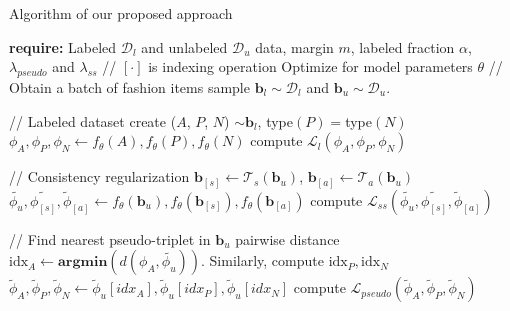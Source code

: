 \documentclass[sigconf]{acmart}
\newcommand{\algocomment}[1]{{\color{algoGray} #1}}
\begin{document}
\begin{algorithm}
\caption{Algorithm of our proposed approach}
\label{algo}
\begin{algorithmic}[1]
\small
\STATE \textbf{require:} Labeled $\mathcal{D}_l$ and unlabeled $\mathcal{D}_u$ data, margin $m$, labeled fraction $\alpha$, $\lambda_{pseudo}$ and $\lambda_{ss}$ \algocomment{// $[\cdot]$ is indexing operation} 
\STATE Optimize for model parameters $\theta$ 
\STATE {} 
	\STATE  \hspace{0.1in} \algocomment{{ // Obtain a batch of fashion items }}
      \STATE \hspace{0.1in} sample $\mathbf{b}_l \sim \mathcal{D}_l$ and $\mathbf{b}_u \sim \mathcal{D}_u$.
       
    \STATE \vspace{1mm} \hspace{0.1in} \algocomment{{// Labeled dataset }}
      \STATE \hspace{0.1in} create ($A$, $P$, $N$) $\sim \mathbf{b}_l$,  type$(P) = $type$(N)$ ~~~ 
      \STATE \hspace{0.1in} $\phi_A, \phi_P, \phi_N \leftarrow f_{\theta}(A), f_{\theta}(P), f_{\theta}(N)$ 
      \STATE \hspace{0.1in} compute $\mathcal{L}_l(\phi_A, \phi_P, \phi_N)$

\STATE  \vspace{1.5mm} \hspace{0.1\in} \algocomment{{// Consistency regularization }}
\STATE \hspace{0.1in} $\mathbf{b}_{[s]} \leftarrow \mathcal{T}_s (\mathbf{b}_u)$, $\mathbf{b}_{[a]} \leftarrow \mathcal{T}_a (\mathbf{b}_u)$  
\STATE \hspace{0.1in} $\tilde{\phi_u}, \tilde{\phi_{[s]}}, \tilde{\phi}_{[a]}\leftarrow f_{\theta}(\mathbf{b}_u), f_{\theta}(\mathbf{b}_{[s]}), f_{\theta}(\mathbf{b}_{[a]})$ 
\STATE \hspace{0.1in} compute $\mathcal{L}_{ss}(\tilde{\phi_u}, \tilde{\phi_{[s]}}, \tilde{\phi}_{[a]})$


\STATE \vspace{1.5mm}\hspace{0.1in} \algocomment{{// Find nearest pseudo-triplet in $\mathbf{b}_u$}}
\STATE \hspace{0.1in} pairwise distance $\text{idx}_A\leftarrow\mathbf{argmin}(d(\phi_A, \tilde{\phi_u}))$. Similarly, compute $\text{idx}_P, \text{idx}_N$ 
\STATE \hspace{0.1in} $\tilde{\phi}_A, \tilde{\phi}_P, \tilde{\phi}_N \leftarrow \tilde{\phi}_u [idx_A], \tilde{\phi}_u [idx_P], \tilde{\phi}_u [idx_N]$ 
\STATE \hspace{0.1in} compute $\mathcal{L}_{pseudo}(\tilde{\phi}_A, \tilde{\phi}_P, \tilde{\phi}_N)$




\end{algorithmic}
\end{algorithm}
\end{document}
